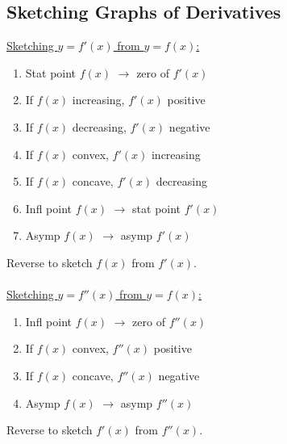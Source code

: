 \documentclass[10pt, a4paper, titlepage]{article}
\begin{document}
\begin{multicols*}{3}
\subsection{Sketching Graphs of Derivatives}
\underline{Sketching $y=f'(x)$ from $y=f(x)$:}
\begin{enumerate}
	\item Stat point $f(x)$ $\rightarrow$ zero of $f'(x)$
	\item If $f(x)$ increasing, $f'(x)$ positive
	\item If $f(x)$ decreasing, $f'(x)$ negative
	\item If $f(x)$ convex, $f'(x)$ increasing
	\item If $f(x)$ concave, $f'(x)$ decreasing
	\item Infl point $f(x)$ $\rightarrow$ stat point $f'(x)$
	\item Asymp $f(x)$ $\rightarrow$ asymp $f'(x)$
\end{enumerate}
Reverse to sketch $f(x)$ from $f'(x)$.\\\\
\underline{Sketching $y=f''(x)$ from $y=f(x)$:}
\begin{enumerate}
	\item Infl point $f(x)$ $\rightarrow$ zero of $f''(x)$
	\item If $f(x)$ convex, $f''(x)$ positive
	\item If $f(x)$ concave, $f''(x)$ negative
	\item Asymp $f(x)$ $\rightarrow$ asymp $f''(x)$
\end{enumerate}
Reverse to sketch $f'(x)$ from $f''(x)$.\\

\dotfill

\end{multicols*}
\end{document}
